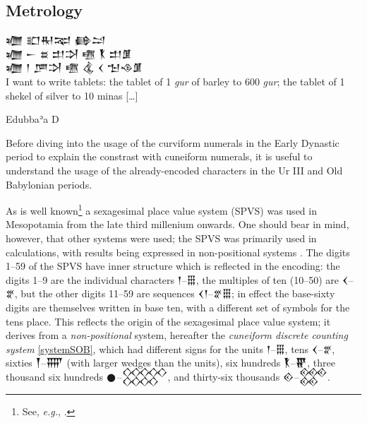 \documentclass[10pt, a4paper, twoside]{article}
\newcommand{\exempligratia}{\emph{e.g.}}
\begin{document}
\subsection{Metrology}
\label{metrology}
\epigraph{{\obfont 𒁾 𒊬𒊑𒉈 𒂵𒁺} \\ {\obfont 𒁾 𒀸 𒊺 𒄥𒋫 𒍠 {\nafont 𒐞} 𒄥𒂠} \\ {\obfont 𒁾 𒁹 𒂆𒋫 𒍠 𒆬 𒌋 𒈠𒈾𒂠} \\
I want to write tablets: the tablet of 1 \emph{gur} of barley to
600 \emph{gur}; the tablet of 1 shekel of silver to 10 minas […]}{Edubbaʾa D}

Before diving into the usage of the curviform numerals
in the Early Dynastic period to explain the constrast
with cuneiform numerals, it is useful to understand
the usage of the already-encoded characters in the
Ur III and Old Babylonian periods.

As is well known\footnote{See, \exempligratia, \cite[Section 22.3.3 ``Non-Decimal Radix Systems'',
\emph{sub} ``\href{https://www.unicode.org/versions/Unicode16.0.0/core-spec/chapter-22/\#G42894}{Cuneiform Numerals}'']{Unicode16}.}
a sexagesimal place value system (SPVS) was used in Meso\-potamia from the late third millenium onwards.
One should bear in mind, however, that other systems were used;
the SPVS was primarily used in calculations,
with results being expressed in non-positional systems \cites[76]{Robson2008}{Robson2022}.
The digits 1–59 of the SPVS have inner structure which is reflected in the encoding: the digits 1–9 are the individual
characters {\xsuxfont 𒁹}–{\xsuxfont 𒑆}, the multiples of ten (10–50) are {\xsuxfont 𒌋}–{\xsuxfont 𒐐},
but the other digits 11–59 are sequences {\xsuxfont 𒌋𒁹}–{\xsuxfont 𒐐𒑆};
in effect the base-sixty digits are themselves written in base ten, with a different set of symbols for the tens place.
This reflects the origin of the sexagesimal place value system;
it derives from a \emph{non-positional} system, hereafter the \emph{cuneiform discrete counting system} \ref{systemSOB},
which had different signs for the units {\xsuxfont 𒁹}–{\xsuxfont 𒑆},
tens {\xsuxfont 𒌋}–{\xsuxfont 𒐐}, sixties {\xsuxfont 𒐕}–{\xsuxfont 𒐝} (with larger wedges
than the units), six hundreds {\xsuxfont 𒐞}–{\xsuxfont 𒐢},
three thousand six hundreds {\xsuxfont 𒊹}–{\xsuxfont 𒐫}, and thirty-six thousands
 {\xsuxfont 𒐬}–{\xsuxfont 𒐱}.
\end{document}
